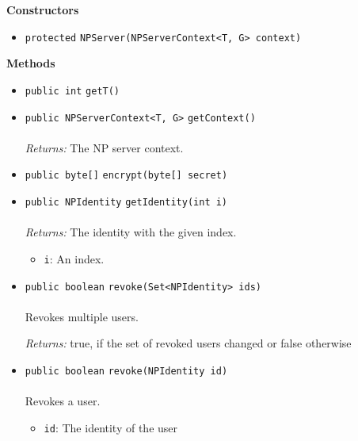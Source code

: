\textbf{\sffamily Constructors}
\begin{itemize}
\item \lstinline|protected| \lstinline|NPServer|\lstinline|(NPServerContext<T, G> context)| \\[-0.6em]




\end{itemize}


\textbf{\sffamily Methods}
\begin{itemize}
\item \lstinline|public int| \lstinline|getT|\lstinline|()| \\[-0.6em]




\item \lstinline|public NPServerContext<T, G>| \lstinline|getContext|\lstinline|()|\\ \\[-0.6em]
\emph{Returns:} The NP server context.



\item \lstinline|public byte[]| \lstinline|encrypt|\lstinline|(byte[] secret)| \\[-0.6em]




\item \lstinline|public NPIdentity| \lstinline|getIdentity|\lstinline|(int i)|\\ \\[-0.6em]
\emph{Returns:} The identity with the given index.
\begin{itemize}
\item \lstinline|i|: An index.
\end{itemize}



\item \lstinline|public boolean| \lstinline|revoke|\lstinline|(Set<NPIdentity> ids)|\\ \\[-0.6em]
Revokes multiple users.

\emph{Returns:} true, if the set of revoked users changed or false otherwise

\item \lstinline|public boolean| \lstinline|revoke|\lstinline|(NPIdentity id)|\\ \\[-0.6em]
Revokes a user.
\begin{itemize}
\item \lstinline|id|: The identity of the user
\end{itemize}


\end{itemize}
